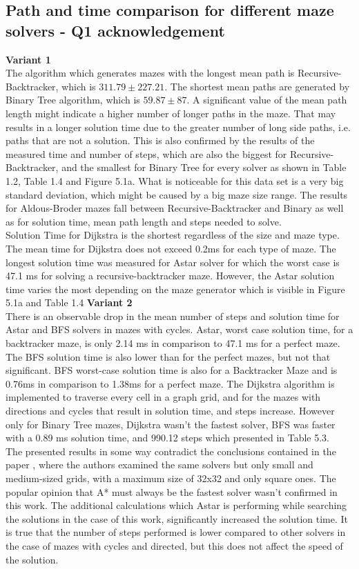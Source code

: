 \subsection{Path and time comparison for different maze solvers - Q1 acknowledgement}
\textbf{Variant 1}\\
The algorithm which generates mazes with the longest mean path is Recursive- Backtracker, which is $311.79\pm 227.21$. The shortest mean paths are generated by
Binary Tree algorithm, which is $59.87\pm 87$. A significant value of the mean path length might indicate a higher number of longer paths in the maze. That 
may results in a longer solution time due to the greater number of long side paths, i.e. paths that are not a solution. This is also confirmed by the results of
the measured time and number of steps, which are also the biggest for Recursive-Backtracker, and the smallest for Binary Tree for every solver as shown in 
Table 1.2, Table 1.4 and Figure 5.1a. What is noticeable for this data set is a very big standard deviation, which might be caused by a big maze size range.
The results for Aldous-Broder mazes fall between Recursive-Backtracker and Binary as well as for solution time, mean path length and steps needed to solve.\\
\indent Solution Time for Dijkstra is the shortest regardless of the size and maze type. The mean time for Dijkstra does not exceed 0.2ms for each type of maze.
The longest solution time was measured for Astar solver for which the worst case is 47.1 ms for solving a recursive-backtracker maze.
However, the Astar solution time varies the most depending on the maze generator which is visible in Figure 5.1a and Table 1.4
\textbf{Variant 2}\\ 
There is an observable drop in the mean number of steps and solution time for Astar and BFS solvers in mazes with cycles. Astar, worst case solution time, 
for a backtracker maze, is only 2.14 ms in comparison to 47.1 ms for a perfect maze. The BFS solution time is also lower than for the perfect mazes, but not
that significant. BFS worst-case solution time is also for a Backtracker Maze and is 0.76ms in comparison to 1.38ms for a perfect maze. 
The Dijkstra algorithm is implemented to traverse every cell in a graph grid, and for the mazes with directions and cycles that result in solution time, and 
steps increase. However only for Binary Tree mazes, Dijkstra wasn't the fastest solver, BFS was faster with a 0.89 ms solution time, and 990.12 steps which
presented in Table 5.3.\\
\indent The presented results in some way contradict the conclusions contained in the paper \cite{31}, where the authors examined the same solvers but 
only small and medium-sized grids, with a maximum size of 32x32 and only square ones. The popular opinion \cite{32} that A* must always be the fastest solver wasn't
confirmed in this work. The additional calculations which Astar is performing while searching the solutions in the case of this work, significantly increased
the solution time. It is true that the number of steps performed is lower compared to other solvers in the case of mazes with cycles and directed,
but this does not affect the speed of the solution.\\
